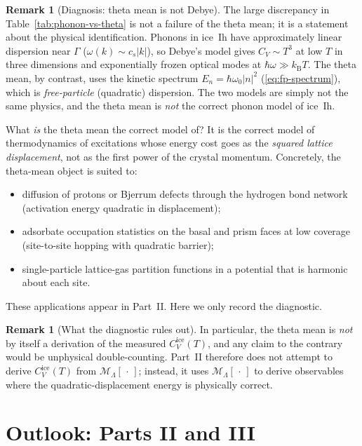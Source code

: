 \documentclass[11pt,letterpaper]{article}
\theoremstyle{plain}
\theoremstyle{definition}
\newtheorem{remark}[theorem]{Remark}
\newcommand{\Lat}{\Lambda}
\newcommand{\tmean}[1]{\mathcal{M}_{\Lat}[#1]}
\begin{document}
\begin{remark}[Diagnosis: theta mean is not Debye]
\label{rem:diagnostic}
The large discrepancy in Table~\ref{tab:phonon-vs-theta} is not a
failure of the theta mean; it is a statement about the physical
identification.  Phonons in ice~Ih have approximately linear
dispersion near $\Gamma$ ($\omega(k)\sim c_s|k|$), so Debye's
model gives $C_V\sim T^3$ at low $T$ in three dimensions and
exponentially frozen optical modes at $\hbar\omega\gg k_{\mathrm{B}} T$.
The theta mean, by contrast, uses the kinetic spectrum
$E_n=\hbar\omega_0|n|^2$ (\eqref{eq:fp-spectrum}), which is
\emph{free-particle} (quadratic) dispersion.  The two models are
simply not the same physics, and the theta mean is \emph{not} the
correct phonon model of ice~Ih.

What \emph{is} the theta mean the correct model of?  It is the
correct model of thermodynamics of excitations whose energy cost
goes as the \emph{squared lattice displacement}, not as the first
power of the crystal momentum.  Concretely, the theta-mean object
is suited to:
\begin{itemize}[nosep]
\item diffusion of protons or Bjerrum defects through the hydrogen
  bond network (activation energy quadratic in displacement);
\item adsorbate occupation statistics on the basal and prism faces
  at low coverage (site-to-site hopping with quadratic barrier);
\item single-particle lattice-gas partition functions in a potential
  that is harmonic about each site.
\end{itemize}
These applications appear in Part~II.  Here we only record the
diagnostic.
\end{remark}

\begin{remark}[What the diagnostic rules out]
In particular, the theta mean is \emph{not} by itself a derivation
of the measured $C_V^{\text{ice}}(T)$, and any claim to the contrary
would be unphysical double-counting.  Part~II therefore does not
attempt to derive $C_V^{\text{ice}}(T)$ from $\tmean{\,\cdot\,}$;
instead, it uses $\tmean{\,\cdot\,}$ to derive observables where the
quadratic-displacement energy is physically correct.
\end{remark}

\section{Outlook: Parts II and III}\label{sec:outlook}
\end{document}
